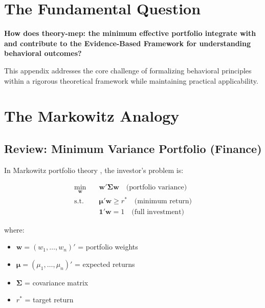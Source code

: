 \section{The Fundamental Question}
\label{sec:mes-fundamental}

\begin{tcolorbox}[
    colback=red!5!white,
    colframe=red!75!black,
    title={\textbf{Fundamental Question}}
]
\textbf{How does theory-mep: the minimum effective portfolio integrate with and contribute to the
Evidence-Based Framework for understanding behavioral outcomes?}

This appendix addresses the core challenge of formalizing behavioral principles
within a rigorous theoretical framework while maintaining practical applicability.
\end{tcolorbox}






\section{The Markowitz Analogy}
\label{sec:mep-analogy}

\subsection{Review: Minimum Variance Portfolio (Finance)}

In Markowitz portfolio theory \citep{markowitz1952}, the investor's problem is:

\begin{equation}
\begin{aligned}
\min_{\mathbf{w}} \quad & \mathbf{w}'\boldsymbol{\Sigma}\mathbf{w} \quad \text{(portfolio variance)} \\
\text{s.t.} \quad & \boldsymbol{\mu}'\mathbf{w} \geq r^* \quad \text{(minimum return)} \\
& \mathbf{1}'\mathbf{w} = 1 \quad \text{(full investment)}
\end{aligned}
\label{eq:markowitz}
\end{equation}

where:
\begin{itemize}[nosep]
\item $\mathbf{w} = (w_1, \ldots, w_n)'$ = portfolio weights
\item $\boldsymbol{\mu} = (\mu_1, \ldots, \mu_n)'$ = expected returns
\item $\boldsymbol{\Sigma}$ = covariance matrix
\item $r^*$ = target return
\end{itemize}

